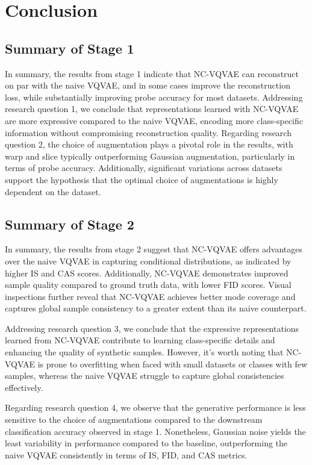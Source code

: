 \documentclass[../../thesis.tex]{subfiles}
\begin{document}
\section{Conclusion}

\subsection*{Summary of Stage 1}

In summary, the results from stage 1 indicate that NC-VQVAE can reconstruct on par with the naive VQVAE, and in some cases improve the reconstruction loss, while substantially improving probe accuracy for most datasets. Addressing research question 1, we conclude that representations learned with NC-VQVAE are more expressive compared to the naive VQVAE, encoding more class-specific information without compromising reconstruction quality. Regarding research question 2, the choice of augmentation plays a pivotal role in the results, with warp and slice typically outperforming Gaussian augmentation, particularly in terms of probe accuracy. Additionally, significant variations across datasets support the hypothesis that the optimal choice of augmentations is highly dependent on the dataset.

\subsection*{Summary of Stage 2}

In summary, the results from stage 2 suggest that NC-VQVAE offers advantages over the naive VQVAE in capturing conditional distributions, as indicated by higher IS and CAS scores. Additionally, NC-VQVAE demonstrates improved sample quality compared to ground truth data, with lower FID scores. Visual inspections further reveal that NC-VQVAE achieves better mode coverage and captures global sample consistency to a greater extent than its naive counterpart.\newline

Addressing research question 3, we conclude that the expressive representations learned from NC-VQVAE contribute to learning class-specific details and enhancing the quality of synthetic samples. However, it's worth noting that NC-VQVAE is prone to overfitting when faced with small datasets or classes with few samples, whereas the naive VQVAE struggle to capture global consistencies effectively.\newline

Regarding research question 4, we observe that the generative performance is less sensitive to the choice of augmentations compared to the downstream classification accuracy observed in stage 1. Nonetheless, Gaussian noise yields the least variability in performance compared to the baseline, outperforming the naive VQVAE consistently in terms of IS, FID, and CAS metrics.
\end{document}
